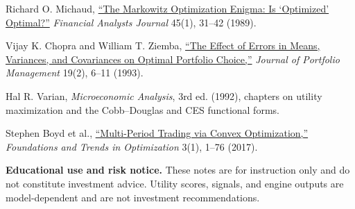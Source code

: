 \documentclass[11pt]{article}
\begin{document}
\begin{readinglist}
  \item Richard O. Michaud, \href{https://doi.org/10.2469/faj.v45.n1.31}{``The Markowitz Optimization Enigma: Is `Optimized' Optimal?''} \emph{Financial Analysts Journal} 45(1), 31--42 (1989).
  \item Vijay K. Chopra and William T. Ziemba, \href{https://doi.org/10.3905/jpm.1993.409440}{``The Effect of Errors in Means, Variances, and Covariances on Optimal Portfolio Choice,''} \emph{Journal of Portfolio Management} 19(2), 6--11 (1993).
  \item Hal R. Varian, \emph{Microeconomic Analysis}, 3rd ed. (1992), chapters on utility maximization and the Cobb--Douglas and CES functional forms.
  \item Stephen Boyd et al., \href{https://web.stanford.edu/~boyd/papers/pdf/multi_period_trading.pdf}{``Multi-Period Trading via Convex Optimization,''} \emph{Foundations and Trends in Optimization} 3(1), 1--76 (2017).
\end{readinglist}

\vfill
{\sffamily\footnotesize\color{vnmuted}\textbf{Educational use and risk notice.} These notes are for instruction only and do not constitute investment advice. Utility scores, signals, and engine outputs are model-dependent and are not investment recommendations.}
\end{document}
